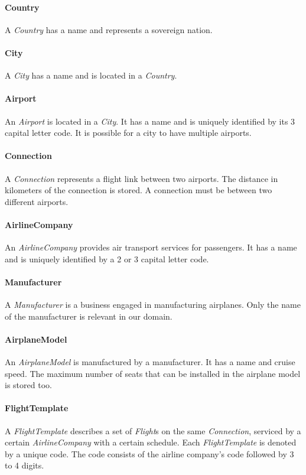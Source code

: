 \documentclass[a4paper]{article}
\newcommand{\field}[1]{\emph{#1}}
\begin{document}
\paragraph{Country}
A \field{Country} has a name and represents a sovereign nation.
\paragraph{City}
A \field{City} has a name and is located in a \field{Country}.
\paragraph{Airport}
An \field{Airport} is located in a \field{City}.
It has a name and is uniquely identified by its 3 capital letter code.
It is possible for a city to have multiple airports.
\paragraph{Connection}
A \field{Connection} represents a flight link between two airports.
The distance in kilometers of the connection is stored.
A connection must be between two different airports.
\paragraph{AirlineCompany}
An \field{AirlineCompany} provides air transport services for passengers.
It has a name and is uniquely identified by a 2 or 3 capital letter code.
\paragraph{Manufacturer}
A \field{Manufacturer} is a business engaged in manufacturing airplanes.
Only the name of the manufacturer is relevant in our domain.
\paragraph{AirplaneModel}
An \field{AirplaneModel} is manufactured by a manufacturer.
It has a name and cruise speed.
The maximum number of seats that can be installed in the airplane model is stored too.
\paragraph{FlightTemplate}\label{par: flighttemplate}
A \field{FlightTemplate} describes a set of \field{Flight}s on the same \field{Connection}, serviced by a certain \field{AirlineCompany} with a certain schedule.
Each \field{FlightTemplate} is denoted by a unique code.
The code consists of the airline company's code followed by 3 to 4 digits.
\end{document}
